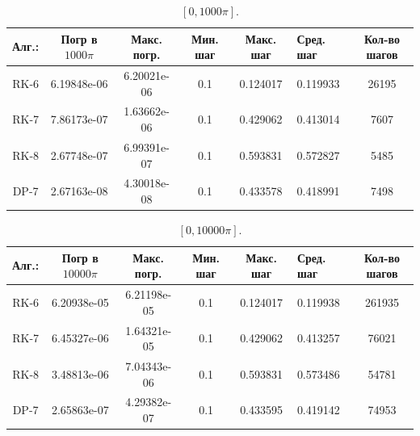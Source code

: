 \documentclass[12pt, a4paper] {article}
\theoremstyle{remark}
\theoremstyle{definition}
\begin{document}
\begin{table}
\caption{\label{tab:canonsummary}$[0, 1000\pi]$.}
\begin{center}
\begin{tabular}{|c|c|c|c|c|с|c|}
\hline
Алг.: & Погр в $1000\pi$ & Макс. погр. & Мин. шаг & Макс. шаг & Сред. шаг & Кол-во шагов \\
\hline
RK-6 &  6.19848e-06 &  6.20021e-06 & 0.1 & 0.124017 & 0.119933 &  26195 \\
\hline
RK-7 & 7.86173e-07 & 1.63662e-06 &  0.1 & 0.429062 & 0.413014 & 7607 \\
\hline
RK-8 & 2.67748e-07 & 6.99391e-07 & 0.1 & 0.593831 & 0.572827 & 5485\\
\hline
DP-7 & 2.67163e-08 & 4.30018e-08 & 0.1 & 0.433578 & 0.418991 & 7498 \\
\hline
\end{tabular}
\end{center}
\end{table} 

\begin{table}
\caption{\label{tab:canonsummary}$[0, 10000\pi]$.}
\begin{center}
\begin{tabular}{|c|c|c|c|c|с|c|}
\hline
Алг.: & Погр в $10000\pi$ & Макс. погр. & Мин. шаг & Макс. шаг & Сред. шаг & Кол-во шагов \\
\hline
RK-6 &  6.20938e-05 &  6.21198e-05 & 0.1 & 0.124017 & 0.119938 &  261935 \\
\hline
RK-7 & 6.45327e-06 & 1.64321e-05 &  0.1 & 0.429062 & 0.413257 & 76021 \\
\hline
RK-8 & 3.48813e-06 & 7.04343e-06 & 0.1 & 0.593831 & 0.573486 & 54781\\
\hline
DP-7 & 2.65863e-07 & 4.29382e-07 & 0.1 & 0.433595 & 0.419142 & 74953 \\
\hline
\end{tabular}
\end{center}
\end{table} 
\end{document}
